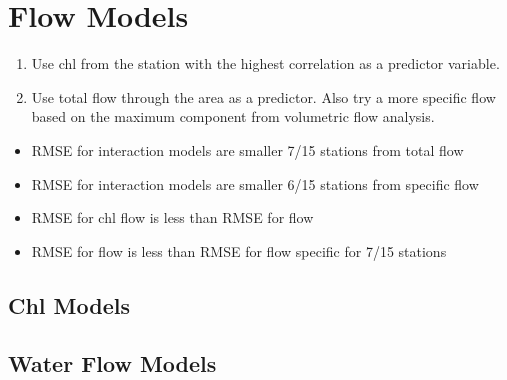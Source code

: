 \documentclass[12pt]{amsart}
\begin{document}
\section{Flow Models}

\begin{enumerate}
\item Use chl from the station with the highest correlation as a predictor variable.
\item Use total flow through the area as a predictor. Also try a more specific flow based on the maximum component from volumetric flow analysis.
\end{enumerate}

\begin{itemize}
\item RMSE for interaction models are smaller 7/15 stations from total flow 
\item RMSE for interaction models are smaller 6/15 stations from  specific flow
\item RMSE for chl flow is less than RMSE for flow
\item RMSE for flow is less than RMSE for flow specific for 7/15 stations
\end{itemize}
\subsection{Chl Models}

\subsection{Water Flow Models}
\end{document}
